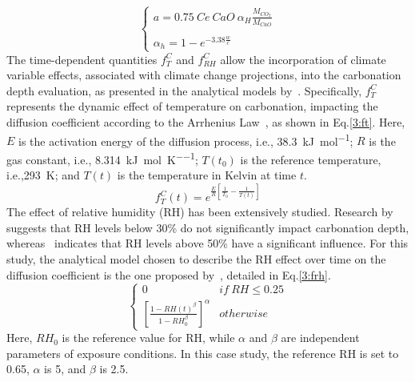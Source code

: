 \begin{equation}
    \left\{
    \begin{array}{ll}
    a = 0.75 \ Ce \ CaO \ \alpha_H \frac{M_{CO_2}}{M_{CaO}} \\
      \\
      \alpha_h = 1 - e^{-3.38 \frac{w}{c}}
    \end{array}
    \right.
    \label{eq_a}
\end{equation}
The time-dependent quantities $f_T^C$ and $f_{RH}^C$ allow the incorporation of climate variable effects, associated with climate change projections, into the carbonation depth evaluation, as presented in the analytical models by~\textcite{Carbonation_BASTIDASARTEAGA}. 
Specifically, $f_T^C$ represents the dynamic effect of temperature on carbonation, impacting the diffusion coefficient according to the Arrhenius Law~\cite{Carbonation_YOON}, as shown in Eq.\ref{3:ft}. Here, $E$ is the activation energy of the diffusion process, i.e.,
\SI{38.3}{\kilo\joule\per\mole}; $R$ is the gas constant, i.e., \SI{8.314}{\kilo\joule\per\mole\per\kelvin}; $T(t_0)$ is the reference temperature, i.e.,\SI{293}{\kelvin}; and $T(t)$ is the temperature in Kelvin at time $t$.
\begin{equation}
    \label{3:ft}
        f_T^C (t) = e^{\frac{E}{R} \left[ \frac{1}{T_0} - \frac{1}{T(t)} \right]}
\end{equation}
The effect of relative humidity (RH) has been extensively studied. Research by~\textcite{f_rh_Al-Khaiat} suggests that RH levels below 30\% do not significantly impact carbonation depth, whereas~\textcite{f_rh_BARY} indicates that RH levels above 50\% have a significant influence. For this study, the analytical model chosen to describe the RH effect over time on the diffusion coefficient is the one proposed by~\textcite{Carbonation_BASTIDASARTEAGA}, detailed in Eq.\ref{3:frh}.
\begin{equation}
    \left\{
    \begin{array}{ll}
    0 & if \ RH \leq 0.25\\
    \left[\frac{1-RH(t)^\beta}{1-RH_0^\beta} \right]^\alpha & otherwise
    \end{array}
    \right.
    \label{3:frh}
\end{equation}
Here, $RH_0$ is the reference value for RH, while $\alpha$ and $\beta$ are independent parameters of exposure conditions. In this case study, the reference RH is set to 0.65, $\alpha$ is 5, and $\beta$ is 2.5.

